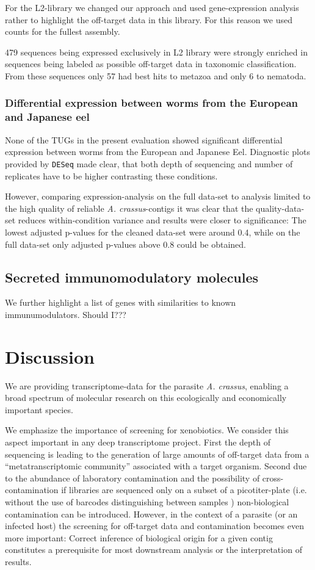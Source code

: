 \documentclass[10pt]{bmc_article}
\newenvironment{bmcformat}{\begin{raggedright}\baselineskip20pt\sloppy\setboolean{publ}{false}}{\end{raggedright}\baselineskip20pt\sloppy}
\begin{document}
\begin{bmcformat}
For the L2-library we changed our approach and used gene-expression
analysis rather to highlight the off-target data in this library. For
this reason we used counts for the fullest assembly.

479 sequences being expressed exclusively
in L2 library were strongly enriched in sequences being labeled as
possible off-target data in taxonomic classification. From these
sequences only 57 had best hits to metazoa and only
6 to nematoda.

\subsubsection*{Differential expression between worms from the European
  and Japanese eel}

None of the TUGs in the present evaluation showed significant
differential expression between worms from the European and Japanese
Eel. Diagnostic plots provided by \texttt{DESeq} made clear, that both
depth of sequencing and number of replicates have to be higher
contrasting these conditions.

However, comparing expression-analysis on the full data-set to analysis
limited to the high quality of reliable \textit{A. crassus}-contigs it
was clear that the quality-data-set reduces within-condition variance
and results were closer to significance: The lowest adjusted p-values
for the cleaned data-set were around 0.4, while on the full data-set
only adjusted p-values above 0.8 could be obtained.

\subsection*{Secreted immunomodulatory molecules}

We further highlight a list of genes with similarities to known
immunumodulators. Should I???


\section*{Discussion}

We are providing transcriptome-data for the parasite
\textit{A. crassus}, enabling a broad spectrum of molecular research
on this ecologically and economically important species.

We emphasize the importance of screening for xenobiotics. We consider
this aspect important in any deep transcriptome project. First the
depth of sequencing is leading to the generation of large amounts of
off-target data from a ``metatranscriptomic community'' associated with a
target organism. Second due to the abundance of laboratory
contamination and the possibility of cross-contamination if libraries
are sequenced only on a subset of a picotiter-plate (i.e. without the
use of barcodes distinguishing between samples \cite{pmid20137071})
non-biological contamination can be introduced. 
However, in the context of a parasite (or an infected host) the
screening for off-target data and contamination becomes even more
important: Correct inference of biological origin for a given contig
constitutes a prerequisite for most downstream analysis or the
interpretation of results.


\end{bmcformat}
\end{document}

